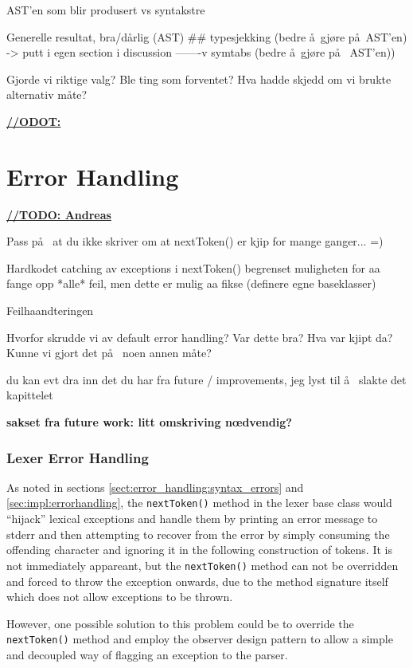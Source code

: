AST'en som blir produsert vs syntakstre

Generelle resultat, bra/d\aa rlig (AST) \#\# typesjekking (bedre \aa~gj\o re p\aa~AST'en) -> putt i egen section i discussion -------v
symtabs (bedre \aa~gj\o re p\aa~ AST'en))

Gjorde vi riktige valg? Ble ting som forventet? Hva hadde skjedd om vi brukte alternativ m\aa te? 

\underline{\textbf{\LARGE //ODOT:}}

\section{Error Handling}
\underline{\textbf{\LARGE //TODO: Andreas}}

Pass p\aa~ at du ikke skriver om at nextToken() er kjip for mange ganger... =)

Hardkodet catching av exceptions i nextToken() begrenset muligheten for aa
fange opp *alle* feil, men dette er mulig aa fikse (definere egne baseklasser)

Feilhaandteringen

Hvorfor skrudde vi av default error handling? Var dette bra? Hva var kjipt da? Kunne vi gjort det p\aa~ noen annen m\aa te?

du kan evt dra inn det du har fra future / improvements, jeg lyst til \aa~ slakte det kapittelet

\textbf{sakset fra future work: litt omskriving n\oe dvendig?}
\subsubsection{Lexer Error Handling}
\label{sect:future_work:lexer_error_handling}
As noted in sections \ref{sect:error_handling:syntax_errors} and
\ref{sec:impl:errorhandling}, the \verb!nextToken()! method in the lexer base class
would ``hijack'' lexical exceptions and handle them by printing an error message
to stderr and then attempting to recover from the error by simply consuming the
offending character and ignoring it in the following construction of tokens. It is 
not immediately appareant, but the \verb!nextToken()! method can not be overridden and
forced to throw the exception onwards, due to the method signature itself which
does not allow exceptions to be thrown. 

However, one possible solution to this problem could be to override the \verb!nextToken()! method and employ the observer design pattern to allow a simple and decoupled way of flagging an exception to the parser.



